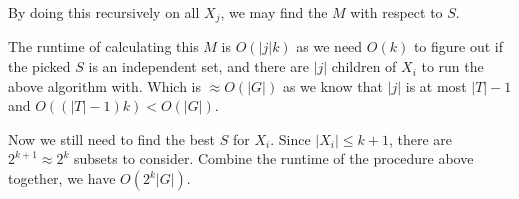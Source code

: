 \documentclass[11pt]{article}
\begin{document}
By doing this recursively on all $X_j$, we may find the $M$ with respect to $S$.\newline

The runtime of calculating this $M$ is $O(|j|k)$ as we need $O(k)$ to figure out if the picked $S$ is an independent set, and there are $|j|$ children of $X_i$ to run the above algorithm with. Which is $\approx O(|G|)$ as we know that $|j|$ is at most $|T| - 1$ and $O((|T| - 1) k) < O(|G|)$.\newline

Now we still need to find the best $S$ for $X_i$. Since $|X_i| \leq k + 1$, there are $2^{k+1} \approx 2^k$ subsets to consider. Combine the runtime of the procedure above together, we have $O(2^k|G|)$.
\end{document}
